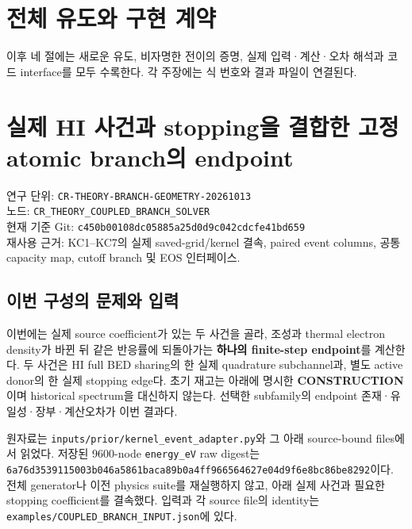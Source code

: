 \documentclass[11pt,a4paper]{article}
\begin{document}
\hypertarget{uxc804uxccb4-uxc720uxb3c4uxc640-uxad6cuxd604-uxacc4uxc57d}{%
\section{전체 유도와 구현 계약}\label{uxc804uxccb4-uxc720uxb3c4uxc640-uxad6cuxd604-uxacc4uxc57d}}

이후 네 절에는 새로운 유도, 비자명한 전이의 증명, 실제 입력·계산·오차 해석과 코드 interface를 모두 수록한다. 각 주장에는 식 번호와 결과 파일이 연결된다.

\hypertarget{uxc2e4uxc81c-hi-uxc0acuxac74uxacfc-stoppinguxc744-uxacb0uxd569uxd55c-uxace0uxc815-atomic-branchuxc758-endpoint}{%
\section{실제 HI 사건과 stopping을 결합한 고정 atomic branch의 endpoint}\label{uxc2e4uxc81c-hi-uxc0acuxac74uxacfc-stoppinguxc744-uxacb0uxd569uxd55c-uxace0uxc815-atomic-branchuxc758-endpoint}}

연구 단위: \nolinkurl{CR-THEORY-BRANCH-GEOMETRY-20261013}\\
노드: \nolinkurl{CR_THEORY_COUPLED_BRANCH_SOLVER}\\
현재 기준 Git: \nolinkurl{c450b00108dc05885a25d0d9c042cdcfe41bd659}\\
재사용 근거: KC1--KC7의 실제 saved-grid/kernel 결속, paired event columns, 공통 capacity map, cutoff branch 및 EOS 인터페이스.

\hypertarget{uxc774uxbc88-uxad6cuxc131uxc758-uxbb38uxc81cuxc640-uxc785uxb825}{%
\subsection{이번 구성의 문제와 입력}\label{uxc774uxbc88-uxad6cuxc131uxc758-uxbb38uxc81cuxc640-uxc785uxb825}}

이번에는 실제 source coefficient가 있는 두 사건을 골라, 조성과 thermal electron density가 바뀐 뒤 같은 반응률에 되돌아가는 \textbf{하나의 finite-step endpoint}를 계산한다. 두 사건은 HI full BED sharing의 한 실제 quadrature subchannel과, 별도 active donor의 한 실제 stopping edge다. 초기 재고는 아래에 명시한 \textbf{CONSTRUCTION}이며 historical spectrum을 대신하지 않는다. 선택한 subfamily의 endpoint 존재·유일성·장부·계산오차가 이번 결과다.

원자료는 \nolinkurl{inputs/prior/kernel_event_adapter.py}와 그 아래 source-bound files에서 읽었다. 저장된 9600-node \texttt{energy\_eV} raw digest는 \nolinkurl{6a76d3539115003b046a5861baca89b0a4ff966564627e04d9f6e8bc86be8292}이다. 전체 generator나 이전 physics suite를 재실행하지 않고, 아래 실제 사건과 필요한 stopping coefficient를 결속했다. 입력과 각 source file의 identity는 \nolinkurl{examples/COUPLED_BRANCH_INPUT.json}에 있다.
\end{document}
